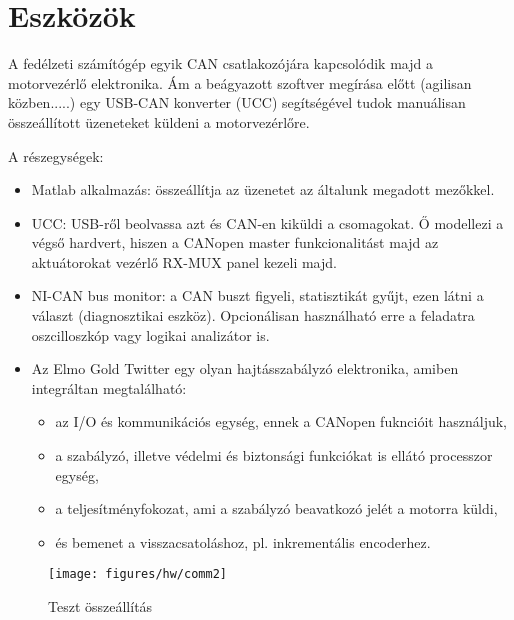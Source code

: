\section{Eszközök}

A fedélzeti számítógép egyik CAN csatlakozójára kapcsolódik majd a motorvezérlő elektronika. Ám a beágyazott szoftver megírása előtt (agilisan közben.....) egy USB-CAN konverter (UCC) segítségével tudok manuálisan összeállított üzeneteket küldeni a motorvezérlőre.



A részegységek:
\begin{itemize}[topsep=-8pt,parsep=0pt,partopsep=-6pt]
	\item Matlab alkalmazás: összeállítja az üzenetet az általunk megadott mezőkkel.
	\item UCC: USB-ről beolvassa azt és CAN-en kiküldi a csomagokat. Ő modellezi a végső hardvert, hiszen a CANopen master funkcionalitást majd az aktuátorokat vezérlő RX-MUX panel kezeli majd.
	\item NI-CAN bus monitor: a CAN buszt figyeli, statisztikát gyűjt, ezen látni a választ (diagnosztikai eszköz). Opcionálisan használható erre a feladatra oszcilloszkóp vagy logikai analizátor is.
	\item 	Az Elmo Gold Twitter egy olyan hajtásszabályzó elektronika, amiben integráltan megtalálható:
	\begin{itemize}
		\item az I/O és kommunikációs egység, ennek a CANopen fukncióit használjuk,
		\item a szabályzó, illetve védelmi és biztonsági funkciókat is ellátó processzor egység,
		\item a teljesítményfokozat, ami a szabályzó beavatkozó jelét a motorra küldi,
		\item és bemenet a visszacsatoláshoz, pl. inkrementális encoderhez.
	\end{itemize}
\end{itemize}


\begin{figure}[H]
	\centering
	\texttt{[image: figures/hw/comm2]}
	\caption{Teszt összeállítás}
	\label{fig-DD}
\end{figure}

%


